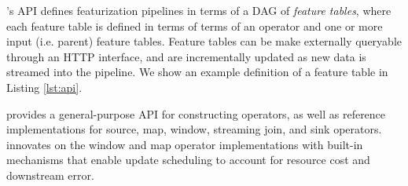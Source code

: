 %

%



\begin{figure}[t]
     
    
    
\end{figure}


%
%
\system{}'s API defines featurization pipelines in terms of a DAG of \textit{feature tables}, where each feature table is defined in terms of terms of an operator and one or more input (i.e. parent) feature tables. Feature tables can be make externally queryable through an HTTP interface, and are incrementally updated as new data is streamed into the pipeline. We show an example definition of a feature table in Listing \cref{lst:api}.
%
%

\system{} provides a general-purpose API for constructing operators, as well as reference implementations
for source, map, window, streaming join, and sink operators.
%
\system{} innovates on the window and map operator implementations with built-in mechanisms that enable update scheduling to account for resource cost and downstream error. 
%

